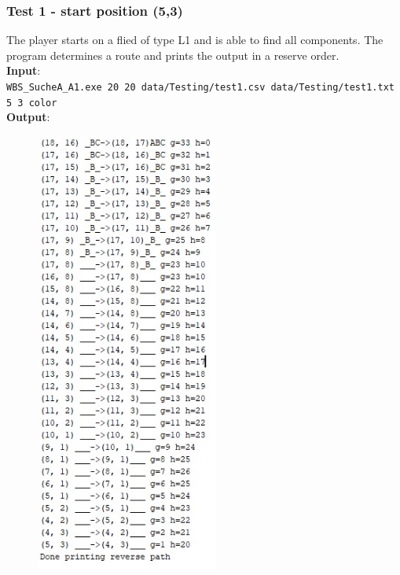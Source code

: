 \documentclass{article}
\begin{document}
\subsubsection*{Test 1 - start position (5,3)}
The player starts on a flied of type L1 and is able to find all components. The program determines a route and prints the output in a reserve order. \\
\textbf{Input}:\\
\texttt{WBS\_SucheA\_A1.exe 20 20 data/Testing/test1.csv data/Testing/test1.txt 5 3 color}\\
\textbf{Output}:
\begin{figure}[H]
\includegraphics[width=6cm]{start53}
\centering
\end{figure}
\end{document}
